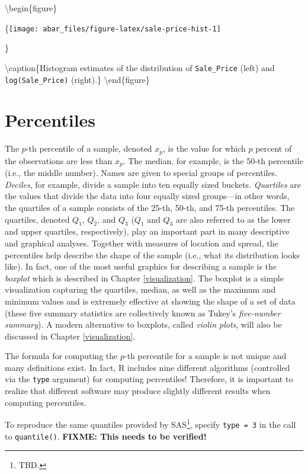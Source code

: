 \documentclass[]{book}
\let\rmarkdownfootnote\footnote%
\def\footnote{\protect\rmarkdownfootnote}
\theoremstyle{definition}
\theoremstyle{definition}
\theoremstyle{definition}
\theoremstyle{remark}
\let\BeginKnitrBlock\begin \let\EndKnitrBlock\end
\begin{document}
\textbackslash{}begin\{figure\}

\{\centering \texttt{[image: abar\_files/figure-latex/sale-price-hist-1]}

\}

\textbackslash{}caption\{Histogram estimates of the distribution of
\texttt{Sale\_Price} (left) and \texttt{log(Sale\_Price)}
(right).\}\label{fig:sale-price-hist} \textbackslash{}end\{figure\}

\hypertarget{percentiles}{%
\section{Percentiles}\label{percentiles}}

The \(p\)-th percentile of a sample, denoted \(x_p\), is the value for
which \(p\) percent of the observations are less than \(x_p\). The
median, for example, is the 50-th percentile (i.e., the middle number).
Names are given to special groups of percentiles. \emph{Deciles}, for
example, divide a sample into ten equally sized buckets.
\emph{Quartiles} are the values that divide the data into four equally
sized groups---in other words, the quartiles of a sample consists of the
25-th, 50-th, and 75-th percentiles. The quartiles, denoted \(Q_1\),
\(Q_2\), and \(Q_3\) (\(Q_1\) and \(Q_3\) are also referred to as the
lower and upper quartiles, respectively), play an important part in many
descriptive and graphical analyses. Together with measures of location
and spread, the percentiles help describe the shape of the sample (i.e.,
what its distribution looks like). In fact, one of the most useful
graphics for describing a sample is the \emph{boxplot} which is
described in Chapter \ref{visualization}. The boxplot is a simple
visualization capturing the quartiles, median, as well as the maximum
and minimum values and is extremely effective at showing the shape of a
set of data (these five summary statistics are collectively known as
Tukey's \emph{five-number summary}). A modern alternative to boxplots,
called \emph{violin plots}, will also be discussed in Chapter
\ref{visualization}.

The formula for computing the \(p\)-th percentile for a sample is not
unique and many definitions exist. In fact, R includes nine different
algorithms (controlled via the \texttt{type} argument) for computing
percentiles! Therefore, it is important to realize that different
software may produce slightly different results when computing
percentiles.

\BeginKnitrBlock{note}
To reproduce the same quantiles provided by SAS\footnote{TBD.}, specify
\texttt{type\ =\ 3} in the call to \texttt{quantile()}. \textbf{FIXME:
This needs to be verified!}
\EndKnitrBlock{note}
\end{document}
